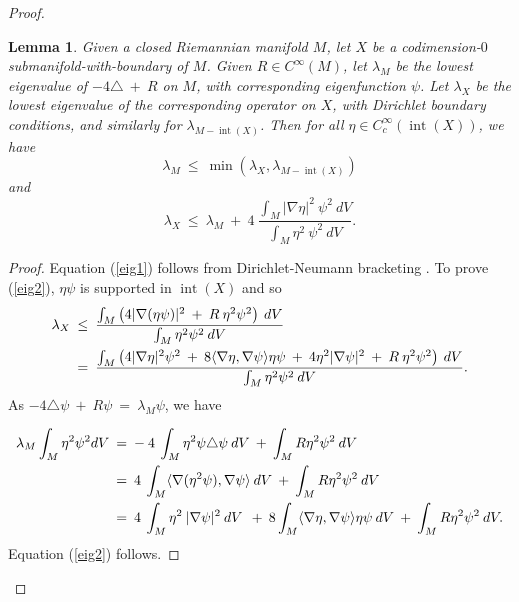 \documentclass[12pt]{amsart}
\newcommand{\Int}{\operatorname{int}}
\numberwithin{equation}{section}
\theoremstyle{plain}
\newtheorem{lemma}[equation]{Lemma}
\theoremstyle{definition}
\theoremstyle{remark}
\begin{document}
\begin{proof}
\begin{lemma} \label{newprop1}
Given a closed Riemannian manifold $M$, let $X$ be a codimension-$0$
submanifold-with-boundary of $M$. Given $R \in C^\infty(M)$, let
$\lambda_M$ be the lowest eigenvalue of $-4\triangle \: + \: R$
on $M$, with corresponding eigenfunction $\psi$. 
Let $\lambda_X$ be the lowest eigenvalue of the corresponding
operator on $X$, with Dirichlet boundary conditions, and similarly
for $\lambda_{M - \Int(X)}$. Then for all
$\eta \in C^\infty_c(\Int(X))$, we have
\begin{equation} \label{eig1}
\lambda_M \: \le \: \min(\lambda_X, \lambda_{M - \Int(X)})
\end{equation}
and
\begin{equation} \label{eig2}
\lambda_X \: \le \: \lambda_M \: + \: 4 \:
\frac{\int_M |\nabla \eta|^2 \: \psi^2 \: dV}{\int_M \eta^2 \: 
\psi^2 \: dV}.
\end{equation}
\end{lemma}
\begin{proof}
Equation (\ref{eig1}) follows from Dirichlet-Neumann bracketing
\cite[Chapter XIII.15]{Reed-Simon}. To prove (\ref{eig2}),
$\eta \psi$ is supported in $\Int(X)$ and so
\begin{align}
\lambda_X \: & \le \: \frac{\int_M \left( 4 |\nabla(\eta \psi)|^2 \: + \:
R \: \eta^2 \psi^2 \right) \: dV}{\int_M \eta^2 \psi^2 \: dV} \\
& = \: \frac{\int_M \left( 4 |\nabla \eta|^2 \psi^2 \: + \:
8 \langle \nabla\eta, \nabla \psi \rangle \eta \psi \: + \:
4 \eta^2 |\nabla \psi|^2 \: + \:
R \: \eta^2 \psi^2 \right) \: dV}{\int_M \eta^2 \psi^2 \: dV}. \notag
\end{align}
As $- 4 \triangle \psi \: + \: R \psi \: = \: \lambda_M \psi$, we have

\begin{align}
\lambda_M \int_M \eta^2 \psi^2 dV \: & = \:
- \: 4 \: \int_M \eta^2 \psi \triangle \psi \: dV \: + \: 
\int_M R \eta^2 \psi^2 \: dV \\
& = \:
4 \: \int_M \langle \nabla(\eta^2 \psi), \nabla \psi \rangle \: dV \: 
+ \: \int_M R \eta^2 \psi^2 \: dV \notag \\
& = \: 4 \: \int_M \eta^2 \: |\nabla \psi|^2 \: dV \: \: + \:  
8 \int_M \langle \nabla\eta, \nabla \psi \rangle \eta \psi \: dV
\: + \: \int_M R \eta^2 \psi^2 \: dV. \notag
\end{align}
Equation (\ref{eig2}) follows.
\end{proof}


\end{proof}
\end{document}
